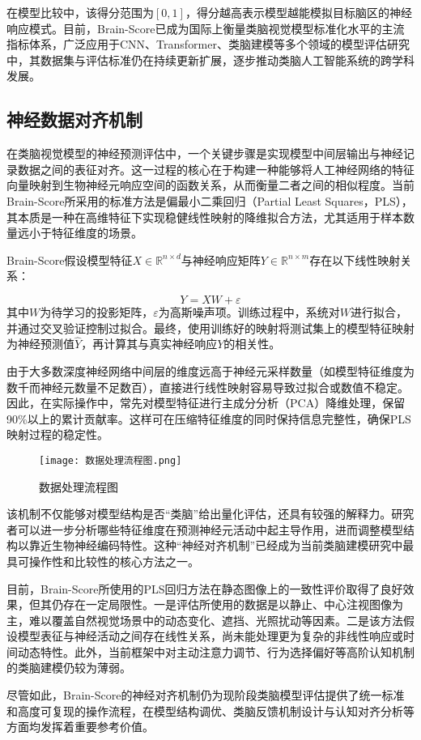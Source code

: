 在模型比较中，该得分范围为$[0, 1]$，得分越高表示模型越能模拟目标脑区的神经响应模式。目前，Brain-Score已成为国际上衡量类脑视觉模型标准化水平的主流指标体系，广泛应用于CNN、Transformer、类脑建模等多个领域的模型评估研究中，其数据集与评估标准仍在持续更新扩展，逐步推动类脑人工智能系统的跨学科发展。

\subsection{神经数据对齐机制}

在类脑视觉模型的神经预测评估中，一个关键步骤是实现模型中间层输出与神经记录数据之间的表征对齐。这一过程的核心在于构建一种能够将人工神经网络的特征向量映射到生物神经元响应空间的函数关系，从而衡量二者之间的相似程度。当前Brain-Score所采用的标准方法是偏最小二乘回归（Partial Least Squares，PLS），其本质是一种在高维特征下实现稳健线性映射的降维拟合方法，尤其适用于样本数量远小于特征维度的场景\cite{hair2019use}。

Brain-Score假设模型特征$X \in \mathbb{R}^{n \times d}$与神经响应矩阵$Y \in \mathbb{R}^{n \times m}$存在以下线性映射关系：

\begin{equation}
	Y = XW + \varepsilon
	\label{eq:linear_model}
\end{equation}
其中$W$为待学习的投影矩阵，$\varepsilon$为高斯噪声项。训练过程中，系统对$W$进行拟合，并通过交叉验证控制过拟合。最终，使用训练好的映射将测试集上的模型特征映射为神经预测值$\hat{Y}$，再计算其与真实神经响应$Y$的相关性。

由于大多数深度神经网络中间层的维度远高于神经元采样数量（如模型特征维度为数千而神经元数量不足数百），直接进行线性映射容易导致过拟合或数值不稳定。因此，在实际操作中，常先对模型特征进行主成分分析（PCA）降维处理，保留90\%以上的累计贡献率。这样可在压缩特征维度的同时保持信息完整性，确保PLS映射过程的稳定性。

\begin{figure}[hbt]
	\centering
	\texttt{[image: 数据处理流程图.png]}
	\caption{数据处理流程图}
	\label{f.sjcllct}
\end{figure}

该机制不仅能够对模型结构是否“类脑”给出量化评估，还具有较强的解释力。研究者可以进一步分析哪些特征维度在预测神经元活动中起主导作用，进而调整模型结构以靠近生物神经编码特性。这种“神经对齐机制”已经成为当前类脑建模研究中最具可操作性和比较性的核心方法之一。

目前，Brain-Score所使用的PLS回归方法在静态图像上的一致性评价取得了良好效果，但其仍存在一定局限性。一是评估所使用的数据是以静止、中心注视图像为主，难以覆盖自然视觉场景中的动态变化、遮挡、光照扰动等因素。二是该方法假设模型表征与神经活动之间存在线性关系，尚未能处理更为复杂的非线性响应或时间动态特性。此外，当前框架中对主动注意力调节、行为选择偏好等高阶认知机制的类脑建模仍较为薄弱。

尽管如此，Brain-Score的神经对齐机制仍为现阶段类脑模型评估提供了统一标准和高度可复现的操作流程，在模型结构调优、类脑反馈机制设计与认知对齐分析等方面均发挥着重要参考价值。

